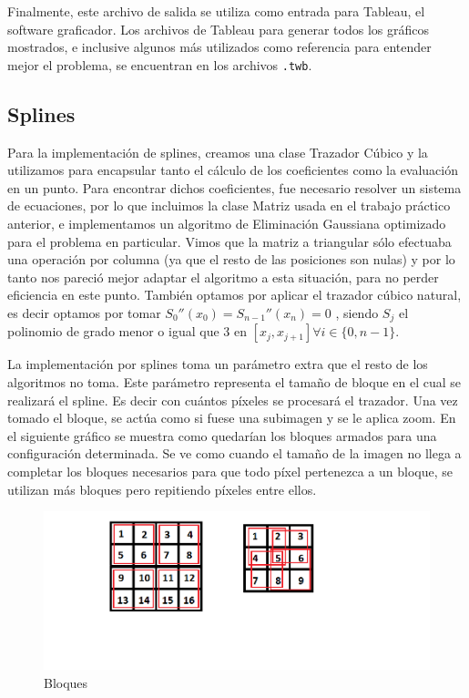 \documentclass{article}
\begin{document}
Finalmente, este archivo de salida se utiliza como entrada para Tableau, el software graficador. Los archivos de Tableau para generar todos los gráficos mostrados, e inclusive algunos más utilizados como referencia para entender mejor el problema, se encuentran en los archivos \texttt{.twb}.

\subsection{Splines}

Para la implementación de splines, creamos una clase Trazador Cúbico y la utilizamos para encapsular tanto el cálculo de los coeficientes como la evaluación en un punto. Para encontrar dichos coeficientes, fue necesario resolver un sistema de ecuaciones, por lo que incluimos la clase Matriz usada en el trabajo práctico anterior, e implementamos un algoritmo de Eliminación Gaussiana optimizado para el problema en particular. Vimos que la matriz a triangular sólo efectuaba una operación por columna (ya que el resto de las posiciones son nulas) y por lo tanto nos pareció mejor adaptar el algoritmo a esta situación, para no perder eficiencia en este punto. También optamos por aplicar el trazador cúbico natural, es decir optamos por tomar $S_{0}''(x_{0})= S_{n-1}'' (x_{n}) = 0$ , siendo $S_{j}$ el polinomio de grado menor o igual que 3 en $[x_{j},x_{j+1}] \forall i \in \{0, n-1\}$.

La implementación por splines toma un parámetro extra que el resto de los algoritmos no toma. Este parámetro representa el tamaño de bloque en el cual se realizará el spline. Es decir con cuántos píxeles se procesará el trazador. Una vez tomado el bloque, se actúa como si fuese una subimagen y se le aplica zoom. En el siguiente gráfico se muestra como quedarían los bloques armados para una configuración determinada. Se ve como cuando el tamaño de la imagen no llega a completar los bloques necesarios para que todo píxel pertenezca a un bloque, se utilizan más bloques pero repitiendo píxeles entre ellos.

\begin{figure}[H]
\centering
  \includegraphics[scale=0.7]{Bloques}
  \caption{Bloques}\label{fig:Bloques}
\end{figure}
\end{document}
